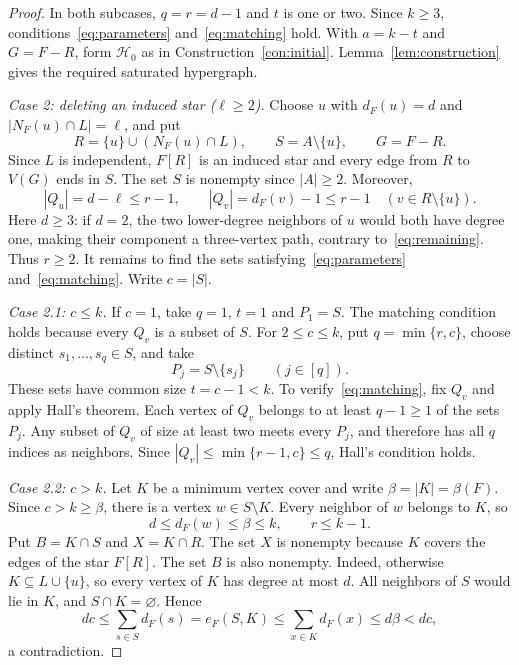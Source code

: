 \documentclass[10pt,a4paper]{article}
\numberwithin{equation}{section}
\theoremstyle{definition}
\theoremstyle{plain}
\newcommand{\HH}{\mathcal H}
\begin{document}
\begin{proof}
In both subcases, $q=r=d-1$ and $t$ is one or two. Since $k\ge3$,
conditions~\eqref{eq:parameters} and~\eqref{eq:matching} hold.
With $a=k-t$ and $G=F-R$, form $\HH_0$ as in
Construction~\ref{con:initial}. Lemma~\ref{lem:construction}
gives the required saturated hypergraph.

\smallskip
\noindent\textit{Case 2: deleting an induced star ($\ell\ge2$).}
Choose $u$ with $d_F(u)=d$ and $|N_F(u)\cap L|=\ell$, and put
\begin{equation}\label{eq:star}
 R=\{u\}\cup(N_F(u)\cap L),\qquad S=A\setminus\{u\},
 \qquad G=F-R.
\end{equation}
Since $L$ is independent, $F[R]$ is an induced star and every edge
from $R$ to $V(G)$ ends in $S$. The set $S$ is nonempty since $|A|\ge2$.
Moreover,
\begin{equation}\label{eq:Qsize}
 |Q_u|=d-\ell\le r-1,\qquad
 |Q_v|=d_F(v)-1\le r-1\quad(v\in R\setminus\{u\}).
\end{equation}
Here $d\ge3$: if $d=2$, the two lower-degree neighbors of $u$ would
both have degree one, making their component a three-vertex path,
contrary to~\eqref{eq:remaining}. Thus $r\ge2$.
It remains to find the sets satisfying~\eqref{eq:parameters}
and~\eqref{eq:matching}. Write $c=|S|$.

\smallskip
\noindent\textit{Case 2.1: $c\le k$.}
If $c=1$, take $q=1$, $t=1$ and $P_1=S$. The matching condition holds
because every $Q_v$ is a subset of $S$.
For $2\le c\le k$, put $q=\min\{r,c\}$, choose distinct
$s_1,\ldots,s_q\in S$, and take
\begin{equation}\label{eq:smallS}
 P_j=S\setminus\{s_j\}\qquad(j\in[q]).
\end{equation}
These sets have common size $t=c-1<k$.
To verify~\eqref{eq:matching}, fix $Q_v$ and apply Hall's theorem.
Each vertex of $Q_v$ belongs to at least $q-1\ge1$ of the sets $P_j$.
Any subset of $Q_v$ of size at least two meets every $P_j$, and
therefore has all $q$ indices as neighbors. Since
$|Q_v|\le\min\{r-1,c\}\le q$, Hall's condition holds.

\smallskip
\noindent\textit{Case 2.2: $c>k$.}
Let $K$ be a minimum vertex cover and write $\beta=|K|=\beta(F)$.
Since $c>k\ge\beta$, there is a vertex $w\in S\setminus K$.
Every neighbor of $w$ belongs to $K$, so
\begin{equation}\label{eq:r-bound}
 d\le d_F(w)\le\beta\le k,\qquad r\le k-1.
\end{equation}
Put $B=K\cap S$ and $X=K\cap R$.
The set $X$ is nonempty because $K$ covers the edges of the star $F[R]$.
The set $B$ is also nonempty. Indeed, otherwise
$K\subseteq L\cup\{u\}$, so every vertex of $K$ has degree at most $d$.
All neighbors of $S$ would lie in $K$, and $S\cap K=\varnothing$.
Hence
\[
 dc\le\sum_{s\in S}d_F(s)
 =e_F(S,K)\le\sum_{x\in K}d_F(x)\le d\beta<dc,
\]
a contradiction.


\end{proof}
\end{document}
